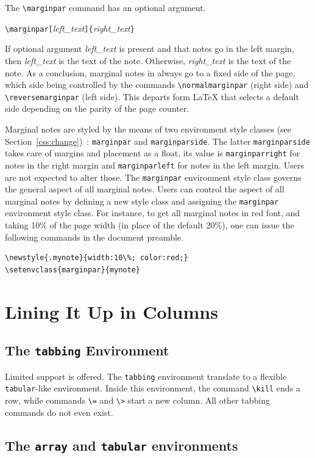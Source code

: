 The \verb+\marginpar+ command has an optional argument.
\begin{flushleft}
\quad\verb+\marginpar[+\textit{left\_text}\verb+]{+\textit{right\_text}\verb+}+
\end{flushleft}
If optional argument \textit{left\_text} is present and that notes
go in the left margin, then \textit{left\_text} is the text of the
note. Otherwise, \textit{right\_text} is the text of the note.
As a conclusion, marginal notes in \hevea{} always go to a fixed side
of the page, which side being controlled by the commands
\verb+\normalmarginpar+ (right side) and \verb+\reversemarginpar+
(left side). This departs form \LaTeX{} that selects a default side
depending on the parity of the page counter.

Marginal notes are styled by the means of two environment style
classes (see Section~\ref{css:change})~:
\verb+marginpar+ and \verb+marginparside+.
The latter \verb+marginparside+ takes care of margins and placement as
a float, its value is \verb+marginparright+ for notes in the right
margin and \verb+marginparleft+ for notes in the left margin.
Users are not expected to alter those.
The \verb+marginpar+ environment style class governs the general
aspect of all marginal notes.
Users can control the aspect of all marginal notes by defining a new
style class and assigning the \verb+marginpar+ environment style
class.
For instance, to get all marginal notes in red font,
and taking 10\% of the page width (in place of the default
20\%),
one can issue the following commands in the document preamble.
\begin{verbatim}
\newstyle{.mynote}{width:10\%; color:red;}
\setenvclass{marginpar}{mynote}
\end{verbatim}


\section{Lining It Up in Columns}
\subsection{The \protect\texttt{tabbing} Environment}
Limited support is offered.
The \texttt{tabbing} environment translate to a flexible \texttt{tabular}-like
environment.
Inside this environment, the command \verb+\kill+ ends a row, while
commands
\verb+\=+ and \verb+\>+ start a new column.
All other tabbing commands do not even exist.

\subsection{The \texttt{array} and \texttt{tabular}
environments}\label{arraydef}

